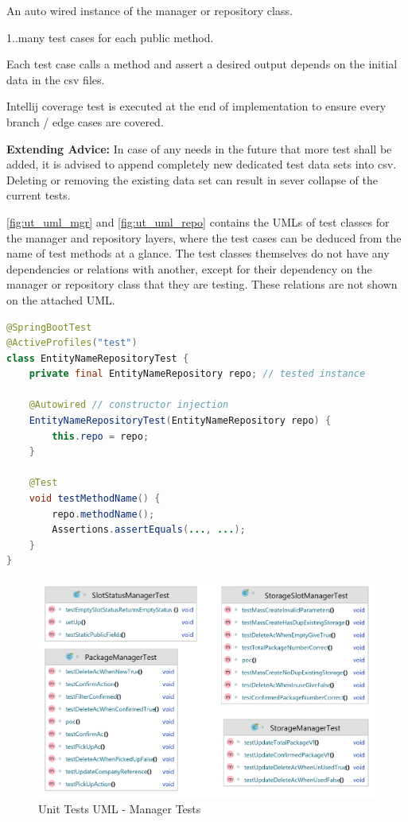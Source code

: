 \begin{compactenum}
    \item An auto wired instance of the manager or repository class.
    \item 1..many test cases for each public method.
    \item Each test case calls a method and assert a desired output depends on the initial data in the csv files.
    \item Intellij coverage test is executed at the end of implementation to ensure every branch / edge cases are covered.
\end{compactenum}

\bigskip
\textbf{Extending Advice:} In case of any needs in the future that more test shall be added, it is advised to append completely new dedicated test data sets into csv. Deleting or removing the existing data set can result in sever collapse of the current tests.

\bigskip
\autoref{fig:ut_uml_mgr} and \autoref{fig:ut_uml_repo} contains the UMLs of test classes for the manager and repository layers, where the test cases can be deduced from the name of test methods at a glance. The test classes themselves do not have any dependencies or relations with another, except for their dependency on the manager or repository class that they are testing. These relations are not shown on the attached UML.

\begin{lstlisting}[language={java}]
@SpringBootTest
@ActiveProfiles("test")
class EntityNameRepositoryTest {
    private final EntityNameRepository repo; // tested instance

    @Autowired // constructor injection
    EntityNameRepositoryTest(EntityNameRepository repo) {
        this.repo = repo; 
    }

    @Test
    void testMethodName() {
        repo.methodName();
        Assertions.assertEquals(..., ...);
    }
}
\end{lstlisting}

\begin{figure}[H]
    \centering
    \includegraphics[width=1\linewidth]{images/test/manager_tests.png}
    \caption{Unit Tests UML - Manager Tests}
    \label{fig:ut_uml_mgr}
\end{figure}

